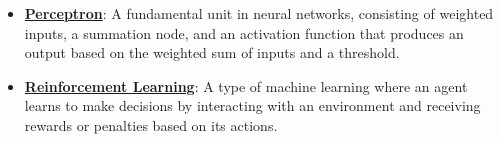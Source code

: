 \documentclass{article}%
\begin{document}
\begin{itemize}[leftmargin=*]
\item \href{\url{https://purdue.brightspace.com/d2l/common/assets/pdfjs-d2l-dist/1.0.14-legacy/web/viewer.html?file=\%252Fcontent\%252Fenforced\%252F1095467-wl.202510.CS.24300.001\%252F02L2-Intro.pdf\%253Fou\%253D1095467\&lang=en-us\&container=d2l-fileviewer-rendered-pdf\&fullscreen=d2l-fileviewer-rendered-pdf-dialog\&height=667}#page=45}{\textbf{Perceptron}}: A fundamental unit in neural networks, consisting of weighted inputs, a summation node, and an activation function that produces an output based on the weighted sum of inputs and a threshold.%
\item \href{\url{https://purdue.brightspace.com/d2l/common/assets/pdfjs-d2l-dist/1.0.14-legacy/web/viewer.html?file=\%252Fcontent\%252Fenforced\%252F1095467-wl.202510.CS.24300.001\%252F02L2-Intro.pdf\%253Fou\%253D1095467\&lang=en-us\&container=d2l-fileviewer-rendered-pdf\&fullscreen=d2l-fileviewer-rendered-pdf-dialog\&height=667}#page=46}{\textbf{Reinforcement Learning}}: A type of machine learning where an agent learns to make decisions by interacting with an environment and receiving rewards or penalties based on its actions.%
\end{itemize}%
\end{document}
